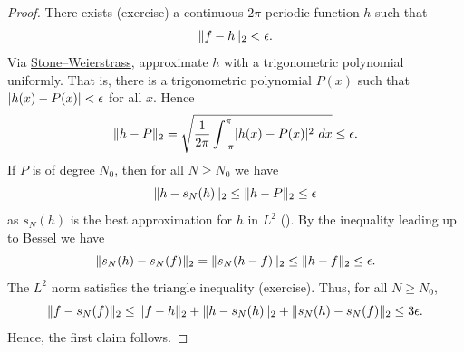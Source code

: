 \begin{proof}
There exists (exercise)
a continuous $2\pi$-periodic function $h$ such that
\begin{equation*}
\lVert {f-h} \rVert_2 < \epsilon .
\end{equation*}
Via \hyperref[thm:SWcomplex]{Stone--Weierstrass},
approximate $h$ with a trigonometric polynomial
uniformly.  That is, there is a trigonometric polynomial $P(x)$
such that
$\lvert {h(x) - P(x)} \rvert < \epsilon$ for all $x$.
Hence
\begin{equation*}
\lVert {h-P} \rVert_2
=
\sqrt{
\frac{1}{2\pi}
\int_{-\pi}^{\pi}
\lvert {h(x)-P(x)} \rvert^2
~
dx
}
\leq \epsilon.
\end{equation*}
If $P$ is of degree $N_0$, then for all $N \geq N_0$ we have
\begin{equation*}
\lVert {h-s_N(h)} \rVert_2 \leq \lVert {h-P} \rVert_2 \leq \epsilon
\end{equation*}
as $s_N(h)$ is the best approximation for $h$ in $L^2$ ().
By the inequality leading up to Bessel we have
\begin{equation*}
\lVert {s_N(h)-s_N(f)} \rVert_2
=
\lVert {s_N(h-f)} \rVert_2
\leq
\lVert {h-f} \rVert_2 \leq \epsilon .
\end{equation*}
The $L^2$ norm satisfies the triangle inequality (exercise).
Thus, for all $N \geq N_0$,
\begin{equation*}
\lVert {f-s_N(f)} \rVert_2
\leq
\lVert {f-h} \rVert_2
+
\lVert {h-s_N(h)} \rVert_2
+
\lVert {s_N(h)-s_N(f)} \rVert_2
\leq 3\epsilon .
\end{equation*}
Hence, the first claim follows.


\end{proof}
